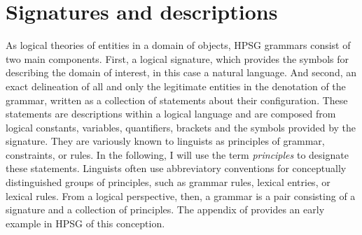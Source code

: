 \documentclass[output=paper
                ,modfonts
                ,nonflat
	        ,collection
	        ,collectionchapter
	        ,collectiontoclongg
 	        ,biblatex
                ,babelshorthands
                ,newtxmath
                ,draftmode
                ,colorlinks, citecolor=brown
]{./langsci/langscibook}
\begin{document}
{{\section{Signatures and descriptions}
\label{sec-signatures}

As logical theories of entities in a domain of objects, HPSG grammars
consist of two main components. First, a logical signature, which
provides the symbols for describing the domain of interest, in this
case a natural language. And second, an exact delineation of all and
only the legitimate entities in the denotation of the grammar, written
as a collection of statements about their configuration. These statements are
descriptions within a logical language and are composed from logical
constants, variables, quantifiers, brackets and the symbols provided
by the signature. They are variously known to linguists as principles
of grammar, constraints, or rules. In the following, I will use the
term \emph{principles} to designate these statements.
Linguists often use abbreviatory
conventions for conceptually distinguished groups of principles, such
as grammar rules, lexical entries, or lexical rules. From a logical
perspective,
then, a grammar is a pair consisting of a signature and a collection
of principles.  The appendix of \citet{PollardSag1994} provides an
early example in HPSG of this conception.

}}
\end{document}
